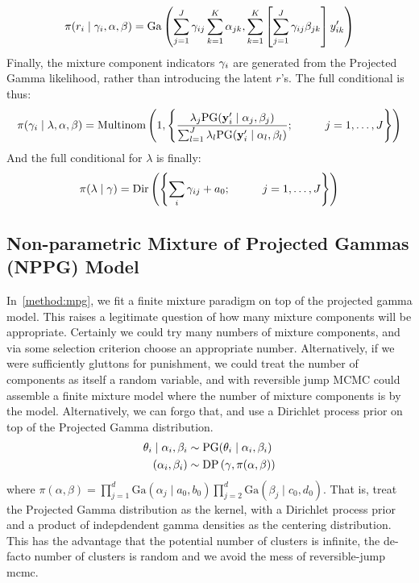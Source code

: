 \begin{equation}
\pi(r_i\mid{\bf \gamma}_i, {\bf \alpha}, {\bf \beta}) = \text{Ga}\left(\sum_{j = 1}^J\gamma_{ij}\sum_{k = 1}^K\alpha_{jk}, \sum_{k = 1}^K\left[\sum_{j = 1}^J\gamma_{ij}\beta_{jk}\right]y_{ik}^{\prime}\right)
\end{equation}
Finally, the mixture component indicators ${\bf \gamma}_i$ are generated from
  the Projected Gamma likelihood, rather than introducing the latent $r$'s.
  The full conditional is thus:
\begin{equation}
\pi({\bf \gamma}_i\mid {\bf \lambda},{\bf \alpha},{\bf \beta}) = \text{Multinom}\left(1, \left\lbrace\frac{\lambda_j\text{PG}({\bf y}_i^{\prime}\mid{\bf \alpha}_j,{\bf \beta}_j)}{\sum_{l = 1}^J\lambda_l\text{PG}({\bf y}_i^{\prime}\mid{\bf \alpha}_l,{\bf \beta}_l)}; \hspace{1cm}j = 1,\ldots,J\right\rbrace\right)
\end{equation}
And the full conditional for $\lambda$ is finally:
\begin{equation}
\pi({\bf \lambda}\mid{\bf \gamma}) = \text{Dir}\left(
\left\lbrace \sum_i\gamma_{ij} + a_0; \hspace{1cm}j = 1,\ldots,J\right\rbrace\right)
\end{equation}

\subsection{Non-parametric Mixture of Projected Gammas (NPPG) Model}
\label{method:nppg}
In~\ref{method:mpg}, we fit a finite mixture paradigm on top of the projected
gamma model.  This raises a legitimate question of how many mixture components
will be appropriate.  Certainly we could try many numbers of mixture components,
and via some selection criterion choose an appropriate number.  Alternatively, if
we were sufficiently gluttons for punishment, we could treat the number of
components as itself a random variable, and with reversible jump MCMC could
assemble a finite mixture model where the number of mixture components is
by the model.  Alternatively, we can forgo that, and use a Dirichlet process
prior on top of the Projected Gamma distribution.
\begin{equation}
  \label{eqn:nppg}
  \begin{aligned}
    \theta_i\mid{\bf \alpha}_i,{\bf \beta}_i &\sim \text{PG}(\theta_i\mid{\bf \alpha}_i,{\bf \beta}_i)\\
    (\alpha_i,\beta_i) &\sim \text{DP}\left(\gamma,\pi(\alpha,\beta)\right)\\
  \end{aligned}
\end{equation}
where $\pi(\alpha,\beta) = \prod_{j = 1}^d\text{Ga}(\alpha_j\mid a_0,b_0)\prod_{j = 2}^d\text{Ga}(\beta_j\mid c_0,d_0)$.
  That is, treat the Projected Gamma distribution as the kernel, with a
  Dirichlet process prior and a product of indepdendent gamma densities as the
  centering distribution.  This has the advantage that the potential number of
  clusters is infinite, the de-facto number of clusters is random and we avoid
  the mess of reversible-jump mcmc.

